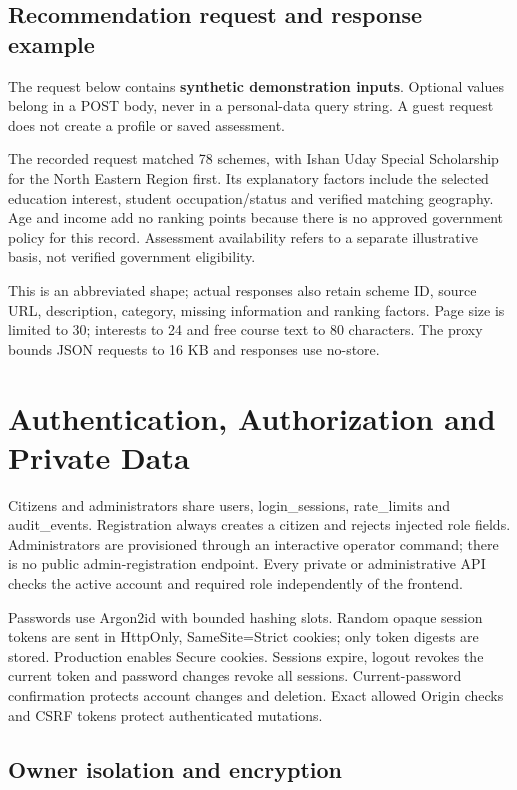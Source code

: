 \documentclass[12pt,a4paper,twoside]{report}
\begin{document}
\subsection*{Recommendation request and response example}

The request below contains \textbf{synthetic demonstration inputs}. Optional values belong in a POST body, never in a personal-data query string. A guest request does not create a profile or saved assessment.

The recorded request matched 78 schemes, with Ishan Uday Special Scholarship for the North Eastern Region first. Its explanatory factors include the selected education interest, student occupation/status and verified matching geography. Age and income add no ranking points because there is no approved government policy for this record. Assessment availability refers to a separate illustrative basis, not verified government eligibility.

This is an abbreviated shape; actual responses also retain scheme ID, source URL, description, category, missing information and ranking factors. Page size is limited to 30; interests to 24 and free course text to 80 characters. The proxy bounds JSON requests to 16 KB and responses use no-store.

\section{Authentication, Authorization and Private Data}

Citizens and administrators share users, login\_sessions, rate\_limits and audit\_events. Registration always creates a citizen and rejects injected role fields. Administrators are provisioned through an interactive operator command; there is no public admin-registration endpoint. Every private or administrative API checks the active account and required role independently of the frontend.

Passwords use Argon2id with bounded hashing slots. Random opaque session tokens are sent in HttpOnly, SameSite=Strict cookies; only token digests are stored. Production enables Secure cookies. Sessions expire, logout revokes the current token and password changes revoke all sessions. Current-password confirmation protects account changes and deletion. Exact allowed Origin checks and CSRF tokens protect authenticated mutations.

\subsection*{Owner isolation and encryption}
\end{document}
